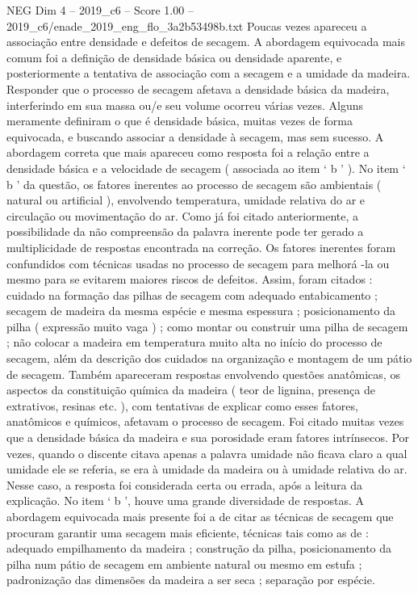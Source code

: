 \begin{textsample}{NEG Dim 4 – 2019\_c6 – Score 1.00 – 2019\_c6/enade\_2019\_eng\_flo\_3a2b53498b.txt}
Poucas vezes apareceu a associação entre densidade e defeitos de secagem.
A abordagem equivocada mais comum foi a definição de densidade básica ou densidade aparente, e posteriormente a tentativa de associação com a secagem e a umidade da madeira.
Responder que o processo de secagem afetava a densidade básica da madeira, interferindo em sua massa ou/e seu volume ocorreu várias vezes.
Alguns meramente definiram o que é densidade básica, muitas vezes de forma equivocada, e buscando associar a densidade à secagem, mas sem sucesso.
A abordagem correta que mais apareceu como resposta foi a relação entre a densidade básica e a velocidade de secagem ( associada ao item ‘ b ’ ).
No item ‘ b ’ da questão, os fatores inerentes ao processo de secagem são ambientais ( natural ou artificial ), envolvendo temperatura, umidade relativa do ar e circulação ou movimentação do ar.
Como já foi citado anteriormente, a possibilidade da não compreensão da palavra inerente pode ter gerado a multiplicidade de respostas encontrada na correção.
Os fatores inerentes foram confundidos com técnicas usadas no processo de secagem para melhorá -la ou mesmo para se evitarem maiores riscos de defeitos.
Assim, foram citados : cuidado na formação das pilhas de secagem com adequado entabicamento ; secagem de madeira da mesma espécie e mesma espessura ; posicionamento da pilha ( expressão muito vaga ) ; como montar ou construir uma pilha de secagem ; não colocar a madeira em temperatura muito alta no início do processo de secagem, além da descrição dos cuidados na organização e montagem de um pátio de secagem.
Também apareceram respostas envolvendo questões anatômicas, os aspectos da constituição química da madeira ( teor de lignina, presença de extrativos, resinas etc. ), com tentativas de explicar como esses fatores, anatômicos e químicos, afetavam o processo de secagem.
Foi citado muitas vezes que a densidade básica da madeira e sua porosidade eram fatores intrínsecos.
Por vezes, quando o discente citava apenas a palavra umidade não ficava claro a qual umidade ele se referia, se era à umidade da madeira ou à umidade relativa do ar.
Nesse caso, a resposta foi considerada certa ou errada, após a leitura da explicação.
No item ‘ b ’, houve uma grande diversidade de respostas.
A abordagem equivocada mais presente foi a de citar as técnicas de secagem que procuram garantir uma secagem mais eficiente, técnicas tais como as de : adequado empilhamento da madeira ; construção da pilha, posicionamento da pilha num pátio de secagem em ambiente natural ou mesmo em estufa ; padronização das dimensões da madeira a ser seca ; separação por espécie.

\end{textsample}
